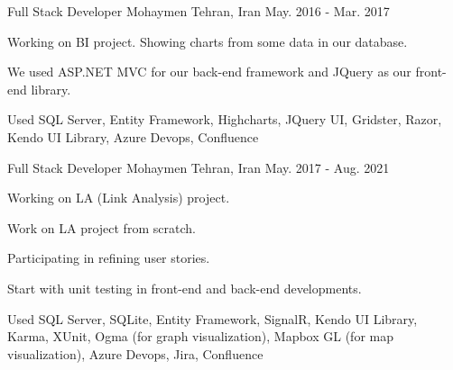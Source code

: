 

\begin{cventries}

  \cventry
    {Full Stack Developer} %
    {Mohaymen} %
    {Tehran, Iran} %
    {May. 2016 - Mar. 2017} %
    {
      \begin{cvitems} %
        \item {Working on BI project. Showing charts from some data in our database.}
        \item {We used ASP.NET MVC for our back-end framework and JQuery as our front-end library.}
        \item {Used SQL Server, Entity Framework, Highcharts, JQuery UI, Gridster, Razor, Kendo UI Library, Azure Devops, Confluence}
      \end{cvitems}
    }

\cventry
{Full Stack Developer} %
{Mohaymen} %
{Tehran, Iran} %
{May. 2017 - Aug. 2021} %
{
\begin{cvitems} %
	\item {Working on LA (Link Analysis) project.}
	\item {Work on LA project from scratch.}
	\item {Participating in refining user stories.}
	\item {Start with unit testing in front-end and back-end developments.}
	\item {Used SQL Server, SQLite, Entity Framework, SignalR, Kendo UI Library, Karma, XUnit, Ogma (for graph visualization), Mapbox GL (for map visualization), Azure Devops, Jira, Confluence}
\end{cvitems}
}



\end{cventries}
